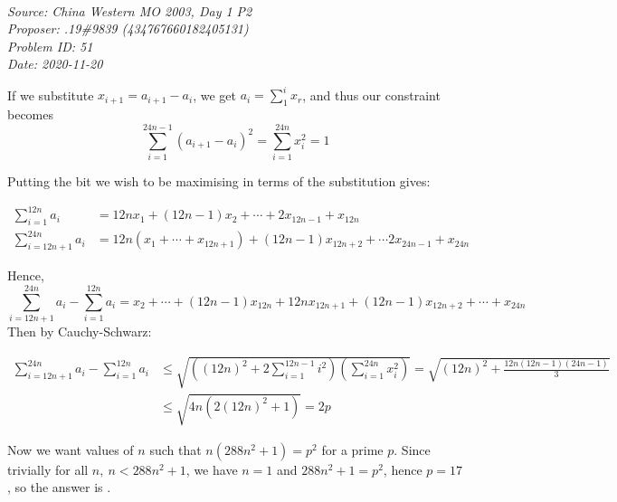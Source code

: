 \SSbreak\\
\emph{Source: China Western MO 2003, Day 1 P2}\\
\emph{Proposer: .19\#9839 (434767660182405131)}\\
\emph{Problem ID: 51}\\
\emph{Date: 2020-11-20}\\
\SSbreak

\bigskip

\begin{solution}\hfil\medskip

    If we substitute \(x_{i+1}=a_{i+1}-a_i\), we get \(a_i=\sum_1^i x_r\), and thus our constraint becomes 
    \begin{equation*}
        \sum_{i=1}^{24n-1}(a_{i+1}-a_i)^2=\sum_{i=1}^{24n}x^2_i=1
    \end{equation*}
    
    Putting the bit we wish to be maximising in terms of the substitution gives:

    \begin{align*}
        \sum_{i=1}^{12n}a_i&=12nx_1+(12n-1)x_2+\cdots+2x_{12n-1}+x_{12n}\\
        \sum_{i=12n+1}^{24n}a_i&=12n(x_1+\cdots+x_{12n+1})+(12n-1)x_{12n+2}+\cdots 2x_{24n-1}+x_{24n}
    \end{align*}

    Hence, 
    \begin{equation*}
        \sum_{i=12n+1}^{24n}a_i-\sum_{i=1}^{12n}a_i=x_2+\cdots+(12n-1)x_{12n}+12nx_{12n+1}+(12n-1)x_{12n+2}+\cdots+x_{24n}
    \end{equation*}
    Then by Cauchy-Schwarz: 

    \begin{align*}
        \sum_{i=12n+1}^{24n}a_i-\sum_{i=1}^{12n}a_i&\leq \sqrt{\left((12n)^2+2\sum_{i=1}^{12n-1}i^2\right)\left(\sum_{i=1}^{24n}x_i^2\right)}=\sqrt{(12n)^2+\frac{12n(12n-1)(24n-1)}{3}}\\
        &\leq\sqrt{4n(2(12n)^2+1)}=2p
    \end{align*}

    Now we want values of \(n\) such that \(n(288n^2+1)=p^2\) for a prime \(p\). Since trivially for all \(n,\ n<288n^2+1\), we have \(n=1\) and \(288n^2+1=p^2\), hence \(p=17\), so the answer is .
\end{solution}